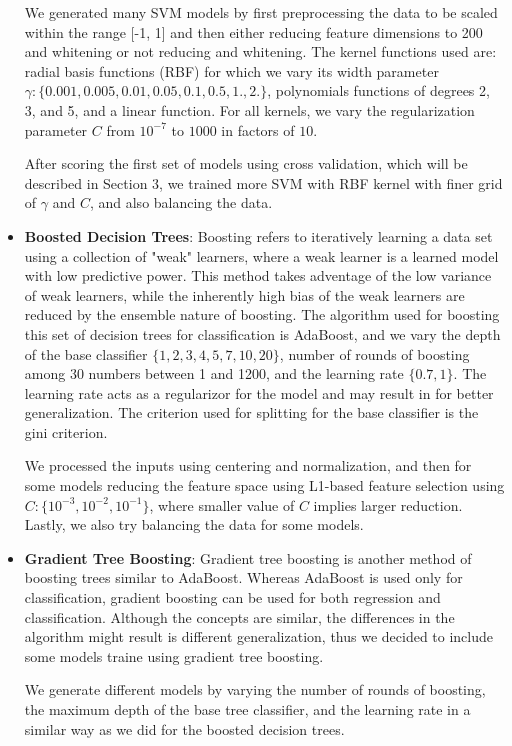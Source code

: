 \documentclass{article}
\renewcommand{\(}{\left(}
\renewcommand{\)}{\right)}
\begin{document}
\begin{itemize}
      We generated many SVM models by first preprocessing the data to be scaled within the range [-1, 1] and then either reducing feature dimensions to 200 and whitening or not reducing and whitening.  The kernel functions used are: radial basis functions (RBF) for which we vary its width parameter $\gamma:\{0.001, 0.005, 0.01, 0.05, 0.1, 0.5, 1., 2.\}$, polynomials functions of degrees 2, 3, and 5, and a linear function. For all kernels, we vary the regularization parameter $C$ from $10^{-7}$ to $1000$ in factors of $10$.    

      After scoring the first set of models using cross validation, which will be described in Section 3, we trained more SVM with RBF kernel with finer grid of $\gamma$ and $C$, and also balancing the data.

    \item \textbf{Boosted Decision Trees}: Boosting refers to iteratively learning a data set using a collection of "weak" learners, where a weak learner is a learned model with low predictive power.  This method takes adventage of the low variance of weak learners, while the inherently high bias of the weak learners are reduced by the ensemble nature of boosting.  The algorithm used for boosting this set of decision trees for classification is AdaBoost, and we vary the depth of the base classifier $\{1, 2, 3, 4, 5, 7, 10, 20\}$, number of rounds of boosting among 30 numbers between 1 and 1200, and the learning rate $\{0.7, 1\}$.  The learning rate acts as a regularizor for the model and may result in for better generalization.  The criterion used for splitting for the base classifier is the gini criterion. 

      We processed the inputs using centering and normalization, and then for some models reducing the feature space using L1-based feature selection using $C:\{10^{-3}, 10^{-2}, 10^{-1}\}$, where smaller value of $C$ implies larger reduction. Lastly, we also try balancing the data for some models.

    \item \textbf{Gradient Tree Boosting}: Gradient tree boosting is another method of boosting trees similar to AdaBoost.  Whereas AdaBoost is used only for classification, gradient boosting can be used for both regression and classification.  Although the concepts are similar, the differences in the algorithm might result is different generalization, thus we decided to include some models traine using gradient tree boosting.

      We generate different models by varying the number of rounds of boosting, the maximum depth of the base tree classifier, and the learning rate in a similar way as we did for the boosted decision trees. 


\end{itemize}
\end{document}
